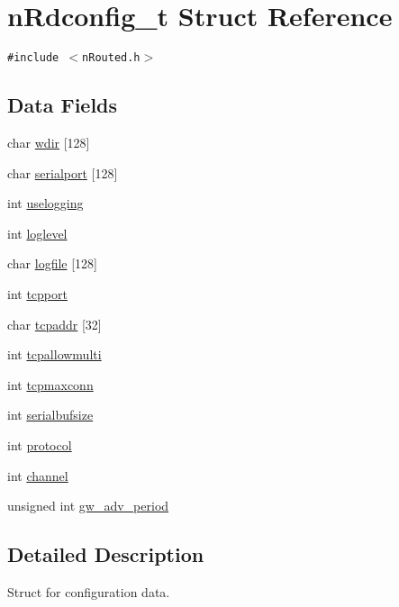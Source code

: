 \hypertarget{structnRdconfig__t}{
\section{n\-Rdconfig\_\-t Struct Reference}
\label{structnRdconfig__t}
}
{\tt \#include $<$n\-Routed.h$>$}

\subsection*{Data Fields}
\begin{CompactItemize}
\item 
char \hyperlink{structnRdconfig__t_a7672061ebda79d00c44848f9fdd92f1}{wdir} \mbox{[}128\mbox{]}
\item 
char \hyperlink{structnRdconfig__t_3547a24e8d3de9b4fd944436dc8ac4ce}{serialport} \mbox{[}128\mbox{]}
\item 
int \hyperlink{structnRdconfig__t_1ea3e47a7eb26c77e75e086d43accfb5}{uselogging}
\item 
int \hyperlink{structnRdconfig__t_22ac64dd30576544d6da3aaad596093f}{loglevel}
\item 
char \hyperlink{structnRdconfig__t_5dbdadb12b1dfa4a7266f0ac7b4c9ee6}{logfile} \mbox{[}128\mbox{]}
\item 
int \hyperlink{structnRdconfig__t_38a3366fe88f4f983001879c3d21532b}{tcpport}
\item 
char \hyperlink{structnRdconfig__t_7bc3c655e748fa2f111b01c18ce42e30}{tcpaddr} \mbox{[}32\mbox{]}
\item 
int \hyperlink{structnRdconfig__t_8b2003cf3fd6431e43d6e53ec563a968}{tcpallowmulti}
\item 
int \hyperlink{structnRdconfig__t_76150067cf1ce716265a738d93e46c75}{tcpmaxconn}
\item 
int \hyperlink{structnRdconfig__t_fbda9271df1df01f8670ec718d3b73d3}{serialbufsize}
\item 
int \hyperlink{structnRdconfig__t_69ce236d67271ff0a4c579ab2a9a0698}{protocol}
\item 
int \hyperlink{structnRdconfig__t_888c547a8689e5f5123862381276c21b}{channel}
\item 
unsigned int \hyperlink{structnRdconfig__t_cd53e23e512aeb2e8ad49df6ed9dfd5d}{gw\_\-adv\_\-period}
\end{CompactItemize}


\subsection{Detailed Description}
Struct for configuration data.

